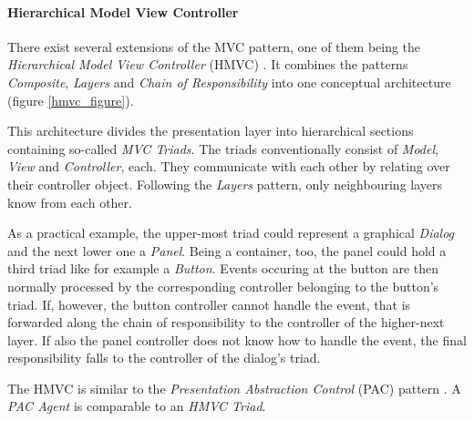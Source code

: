 %
%
%
%
%
%
%

\paragraph{Hierarchical Model View Controller}
\label{hierarchical_model_view_controller_heading}

There exist several extensions of the MVC pattern, one of them being the
\emph{Hierarchical Model View Controller} (HMVC) \cite{cai}. It combines the
patterns \emph{Composite}, \emph{Layers} and \emph{Chain of Responsibility}
into one conceptual architecture (figure \ref{hmvc_figure}).

This architecture divides the presentation layer into hierarchical sections
containing so-called \emph{MVC Triads}. The triads conventionally consist of
\emph{Model}, \emph{View} and \emph{Controller}, each. They communicate with
each other by relating over their controller object. Following the \emph{Layers}
pattern, only neighbouring layers know from each other.

As a practical example, the upper-most triad could represent a graphical
\emph{Dialog} and the next lower one a \emph{Panel}. Being a container, too,
the panel could hold a third triad like for example a \emph{Button}. Events
occuring at the button are then normally processed by the corresponding
controller belonging to the button's triad. If, however, the button controller
cannot handle the event, that is forwarded along the chain of responsibility to
the controller of the higher-next layer. If also the panel controller does not
know how to handle the event, the final responsibility falls to the controller
of the dialog's triad.

The HMVC is similar to the \emph{Presentation Abstraction Control} (PAC) pattern
\cite{buschmann}. A \emph{PAC Agent} is comparable to an \emph{HMVC Triad}.

